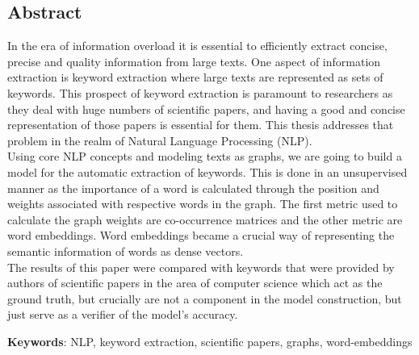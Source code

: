 \documentclass[12pt]{article}
\numberwithin{equation}{section}
\begin{document}
	\begin{spacing}{1.5}
	\section*{Abstract}
	In the era of information overload it is essential to efficiently extract concise, precise and quality information from large texts. One aspect of information extraction is keyword extraction where large texts are represented as sets of keywords. This prospect of keyword extraction is paramount to researchers as they deal with huge numbers of scientific papers, and having a good and concise representation of those papers is essential for them. This thesis addresses that problem in the realm of Natural Language Processing (NLP). \\
	Using core NLP concepts and modeling texts as graphs, we are going to build a model for the automatic extraction of keywords. This is done in an unsupervised manner as the importance of a word is calculated through the position and weights associated with respective words in the graph. The first metric used to calculate the graph weights are co-occurrence matrices and the other metric are word embeddings. Word embeddings became a crucial way of representing the semantic information of words as dense vectors. \\
	The results of this paper were compared with keywords that were provided by authors of scientific papers in the area of computer science which act as the ground truth, but crucially are not a component in the model construction, but just serve as a verifier of the model's accuracy.
	
	\textbf{Keywords}: NLP, keyword extraction, scientific papers, graphs, word-embeddings
	
	\newpage
	\pagestyle{empty}
	\tableofcontents
	\setcounter{page}{0}
	\newpage
	\listoffigures
	\setcounter{page}{0}
	
	\listoftables
    \setcounter{page}{0}
	\pagebreak
	
	\newpage
	\pagestyle{fancy}

\end{spacing}
\end{document}
